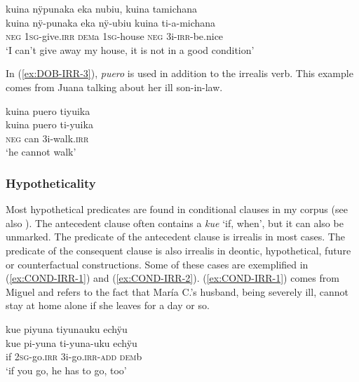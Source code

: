 \ea\label{ex:DOB-IRR-2}
\begingl
\glpreamble kuina nÿpunaka eka nubiu, kuina tamichana\\
\gla kuina nÿ-punaka eka nÿ-ubiu kuina ti-a-michana\\
\glb \textsc{neg} 1\textsc{sg}-give.\textsc{irr} \textsc{dem}a 1\textsc{sg}-house \textsc{neg} 3i-\textsc{irr}-be.nice\\
\glft ‘I can’t give away my house, it is not in a good condition’
\endgl
 \trailingcitation{[mxx-e110820ls.108]}
\xe

In (\ref{ex:DOB-IRR-3}), \textit{puero} is used in addition to the irrealis verb. This example comes from Juana talking about her ill son-in-law.

\ea\label{ex:DOB-IRR-3}
\begingl
\glpreamble kuina puero tiyuika\\
\gla kuina puero ti-yuika\\
\glb \textsc{neg} can 3i-walk.\textsc{irr}\\
\glft ‘he cannot walk’
\endgl
 \trailingcitation{[jxx-p110923l-1.048]}
\xe
{}

\subsubsection{Hypotheticality}\label{sec:Hypotheticality}

Most hypothetical predicates are found in conditional clauses in my corpus (see also ).
The antecedent clause often contains a  \textit{kue} ‘if, when’, but it can also be unmarked. The predicate of the antecedent clause is irrealis in most cases. The predicate of the consequent clause is also irrealis in deontic, hypothetical, future or counterfactual constructions. Some of these cases are exemplified in (\ref{ex:COND-IRR-1}) and (\ref{ex:COND-IRR-2}). 
(\ref{ex:COND-IRR-1}) comes from Miguel and refers to the fact that María C.’s husband, being severely ill, cannot stay at home alone if she leaves for a day or so.

\ea\label{ex:COND-IRR-1}
\begingl 
\glpreamble kue piyuna tiyunauku echÿu\\
\gla kue pi-yuna ti-yuna-uku echÿu\\ 
\glb if 2\textsc{sg}-go.\textsc{irr} 3i-go.\textsc{irr}-\textsc{add} \textsc{dem}b\\ 
\glft ‘if you go, he has to go, too’
 \trailingcitation{[mux-c110810l.042]}
\xe

